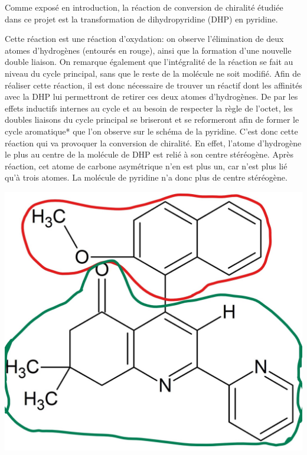\documentclass{article}
\begin{document}
Comme exposé en introduction, la réaction de conversion de chiralité étudiée dans ce projet est la transformation de dihydropyridine (DHP) en pyridine. \par
\medbreak
Cette réaction est une réaction d’oxydation: on observe l’élimination de deux atomes d’hydrogènes (entourés en rouge), ainsi que la formation d’une nouvelle double liaison.  On remarque également que l’intégralité de la réaction se fait au niveau du cycle principal, sans que le reste de la molécule ne soit modifié.
Afin de réaliser cette réaction, il est donc nécessaire de trouver un réactif dont les affinités avec la DHP lui permettront de retirer ces deux atomes d’hydrogènes. De par les effets inductifs internes au cycle et au besoin de respecter la règle de l’octet, les doubles liaisons du cycle principal se briseront et se reformeront afin de former le cycle aromatique* que l’on observe sur le schéma de la pyridine.
\medbreak
C’est donc cette réaction qui va provoquer la conversion de chiralité. En effet, l’atome d’hydrogène le plus au centre de la molécule de DHP est relié à son centre stéréogène. Après réaction, cet atome de carbone asymétrique n’en est plus un, car n’est plus lié qu’à trois atomes. La molécule de pyridine n’a donc plus de centre stéréogène.
\medbreak

\begin{center}
\includegraphics[scale = 0.1]{b}
\end{center}
\end{document}
